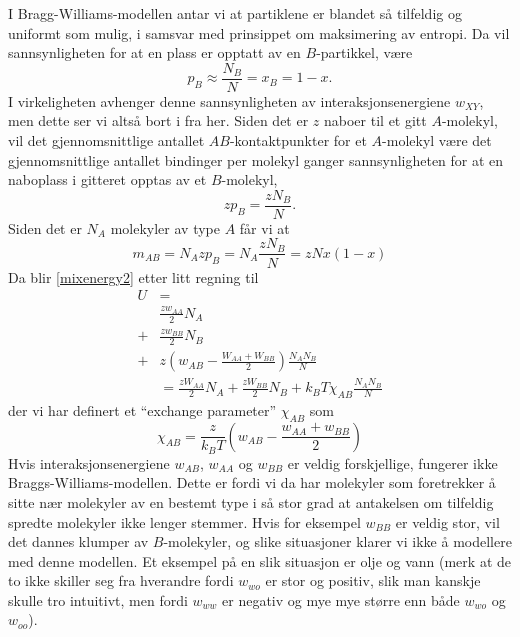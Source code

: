 I Bragg-Williams-modellen antar vi at partiklene er blandet så tilfeldig og uniformt som mulig, i samsvar med prinsippet om maksimering av entropi. Da vil sannsynligheten for at en plass er opptatt av en $B$-partikkel, være
\begin{equation}
	p_B\approx\frac{N_B}{N}=x_B=1-x.
\end{equation}
I virkeligheten avhenger denne sannsynligheten av interaksjonsenergiene $w_{XY}$, men dette ser vi altså bort i fra her. Siden det er $z$ naboer til et gitt $A$-molekyl, vil det gjennomsnittlige antallet $AB$-kontaktpunkter for et $A$-molekyl være det gjennomsnittlige antallet bindinger per molekyl ganger sannsynligheten for at en naboplass i gitteret opptas av et $B$-molekyl,
\begin{equation}
	zp_B=\frac{zN_B}{N}.
\end{equation}
Siden det er $N_A$ molekyler av type $A$ får vi at
\begin{equation}
	m_{AB}=N_Azp_B=N_A\frac{zN_B}{N}=zNx(1-x)
\end{equation}
Da blir \eqref{mixenergy2} etter litt regning til
\begin{align}
	U &= \\
	&\frac{zw_{AA}}{2}N_A \\
	+&\frac{zw_{BB}}{2}N_B \\
	+&z\left(w_{AB}-\frac{W_{AA}+W_{BB}}{2}\right)\frac{N_AN_B}{N} \\
	&=\frac{zW_{AA}}{2}N_A+\frac{zW_{BB}}{2}N_B+k_BT\chi_{AB}\frac{N_AN_B}{N}
\end{align}
der vi har definert et ``exchange parameter'' $\chi_{AB}$ som
\begin{equation}
	\label{chi}
	\chi_{AB}=\frac{z}{k_BT}\left(w_{AB}-\frac{w_{AA}+w_{BB}}{2}\right)
\end{equation}
Hvis interaksjonsenergiene $w_{AB}$, $w_{AA}$ og $w_{BB}$ er veldig forskjellige, fungerer ikke Braggs-Williams-modellen. Dette er fordi vi da har molekyler som foretrekker å sitte nær molekyler av en bestemt type i så stor grad at antakelsen om tilfeldig spredte molekyler ikke lenger stemmer. Hvis for eksempel $w_{BB}$ er veldig stor, vil det dannes klumper av $B$-molekyler, og slike situasjoner klarer vi ikke å modellere med denne modellen. Et eksempel på en slik situasjon er olje og vann (merk at de to ikke skiller seg fra hverandre fordi $w_{wo}$ er stor og positiv, slik man kanskje skulle tro intuitivt, men fordi $w_{ww}$ er negativ og mye mye større enn både $w_{wo}$ og $w_{oo}$).


